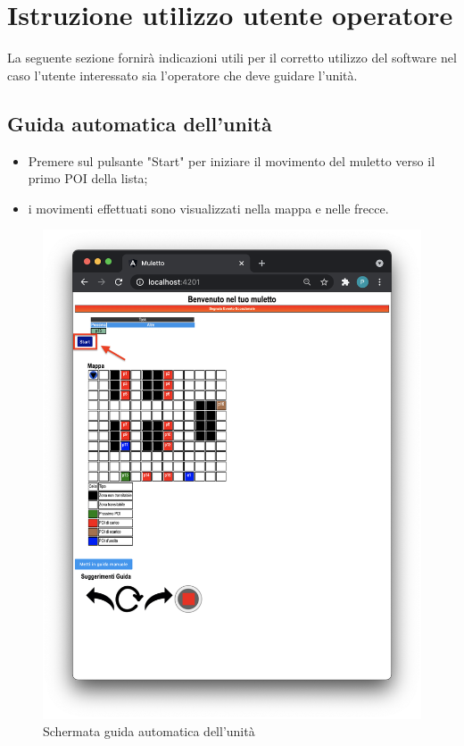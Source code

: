 \section{Istruzione utilizzo utente operatore}
La seguente sezione fornirà indicazioni utili per il corretto utilizzo del software nel caso l'utente interessato sia l'operatore che deve guidare l'unità.

\subsection{Guida automatica dell'unità}
\begin{itemize}
    \item Premere sul pulsante "Start" per iniziare il movimento del muletto verso il primo POI della lista;
    \item i movimenti effettuati sono visualizzati nella mappa e nelle frecce.
    
\end{itemize}
\begin{figure}[H]
    \centering
    \includegraphics[scale=0.45]{res/images/forklift_start.png}
    \caption{Schermata guida automatica dell'unità}
\end{figure}
\pagebreak

